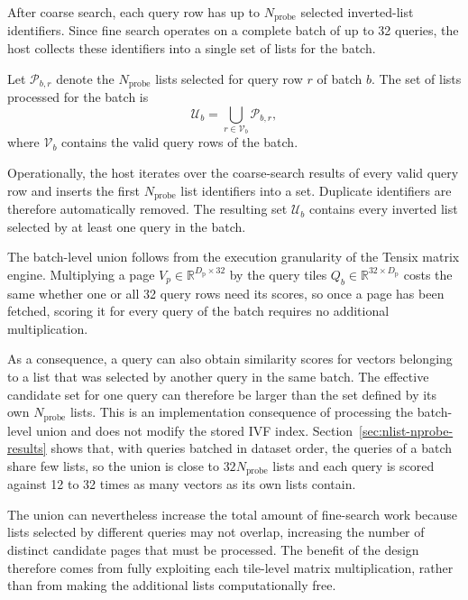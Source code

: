 After coarse search, each query row has up to \(N_{\mathrm{probe}}\) selected inverted-list identifiers. Since fine search operates on a complete batch of up to 32 queries, the host collects these identifiers into a single set of lists for the batch.

Let \(\mathcal{P}_{b,r}\) denote the \(N_{\mathrm{probe}}\) lists selected for query row \(r\) of batch \(b\). The set of lists processed for the batch is
\begin{equation}
\mathcal{U}_b
=
\bigcup_{r\in\mathcal{V}_b}
\mathcal{P}_{b,r},
\label{eq:batch-union}
\end{equation}
where \(\mathcal{V}_b\) contains the valid query rows of the batch.

Operationally, the host iterates over the coarse-search results of every valid query row and inserts the first \(N_{\mathrm{probe}}\) list identifiers into a set. Duplicate identifiers are therefore automatically removed. The resulting set \(\mathcal{U}_b\) contains every inverted list selected by at least one query in the batch.

The batch-level union follows from the execution granularity of the Tensix matrix engine. Multiplying a page \(V_p\in\mathbb{R}^{D_{\mathrm{p}}\times32}\) by the query tiles \(Q_b\in\mathbb{R}^{32\times D_{\mathrm{p}}}\) costs the same whether one or all 32 query rows need its scores, so once a page has been fetched, scoring it for every query of the batch requires no additional multiplication.

As a consequence, a query can also obtain similarity scores for vectors belonging to a list that was selected by another query in the same batch. The effective candidate set for one query can therefore be larger than the set defined by its own \(N_{\mathrm{probe}}\) lists. This is an implementation consequence of processing the batch-level union and does not modify the stored IVF index. Section~\ref{sec:nlist-nprobe-results} shows that, with queries batched in dataset order, the queries of a batch share few lists, so the union is close to \(32N_{\mathrm{probe}}\) lists and each query is scored against 12 to 32 times as many vectors as its own lists contain.

The union can nevertheless increase the total amount of fine-search work because lists selected by different queries may not overlap, increasing the number of distinct candidate pages that must be processed. The benefit of the design therefore comes from fully exploiting each tile-level matrix multiplication, rather than from making the additional lists computationally free.

